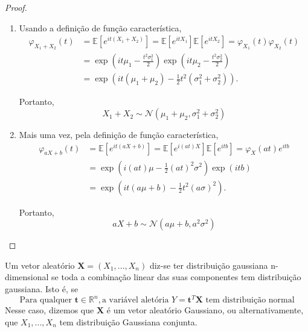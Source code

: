 \documentclass{article}
\begin{document}
\begin{proof}
\begin{enumerate}[label=\roman*), align=left]
    \vspace{0.5cm}

    \item Usando a definição de função característica,
    \begin{align*}
        \varphi_{X_1+X_2}(t)&=\mathbb{E}[e^{it(X_1+X_2)}]=\mathbb{E}[e^{itX_1}]\mathbb{E}[e^{itX_2}]=\varphi_{X_1}(t)\varphi_{X_2}(t)\\
                            &=\exp\left(it\mu_1-\frac{t^2\sigma_1^2}{2} \right) \exp \left( it\mu_2-\frac{t^2\sigma_2^2}{2} \right)\\
                            &=\exp\left( it(\mu_1+\mu_2) -\frac{1}{2}t^2\left( \sigma_1^2+\sigma_2^2 \right) \right).
    \end{align*}

    Portanto, $$X_1+X_2 \sim \mathcal{N}(\mu_1+\mu_2, \sigma_1^2+\sigma_2^2)$$

    \vspace{0.5cm}

    \item Mais uma vez, pela definição de função característica,
    \begin{align*}
        \varphi_{aX+b}(t)& = \mathbb{E}[e^{it(aX+b)}]=\mathbb{E}[e^{i(at)X}]\mathbb{E}[e^{itb}]=\varphi_X(at)e^{itb}\\
                         & = \exp \left( i(at)\mu-\frac{1}{2}(at)^2\sigma^2 \right) \exp(itb)\\
                         & = \exp \left( it(a\mu+b)-\frac{1}{2}t^2(a\sigma)^2 \right).
    \end{align*}

    Portanto, $$aX+b \sim \mathcal{N}(a\mu+b, a^2\sigma^2)$$

    
\end{enumerate}

    
\end{proof}

\vspace{1cm}

\begin{dfn}
Um vetor aleatório $\textbf{X}=(X_1,...,X_n)$ diz-se ter distribuição gaussiana n-dimensional se toda a combinação linear das suas componentes tem distribuição gaussiana. Isto é, se
$$\text{Para qualquer } \mathbf{t}\in \mathbb{R}^n, \text{a variável aletória } Y=\mathbf{t}^T \textbf{X} \text{ tem distribuição normal}$$
Nesse caso, dizemos que $\mathbf{X}$ é um vetor aleatório Gaussiano, ou alternativamente, que $X_1,...,X_n$ tem distribuição Gaussiana conjunta.    
\end{dfn}
\end{document}
